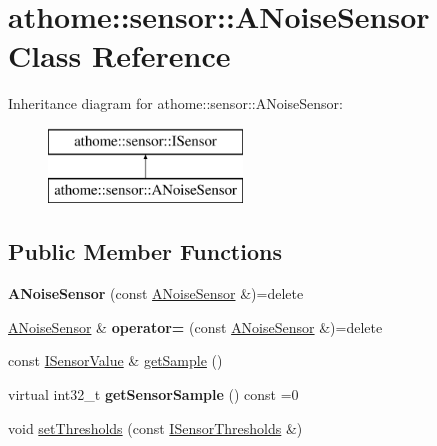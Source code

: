 \hypertarget{classathome_1_1sensor_1_1_a_noise_sensor}{}\section{athome\+:\+:sensor\+:\+:A\+Noise\+Sensor Class Reference}
\label{classathome_1_1sensor_1_1_a_noise_sensor}
Inheritance diagram for athome\+:\+:sensor\+:\+:A\+Noise\+Sensor\+:\begin{figure}[H]
\begin{center}
\leavevmode
\includegraphics[height=2.000000cm]{classathome_1_1sensor_1_1_a_noise_sensor}
\end{center}
\end{figure}
\subsection*{Public Member Functions}
\begin{DoxyCompactItemize}
\item 
\mbox{\label{classathome_1_1sensor_1_1_a_noise_sensor_add13fcd855f63aa6f0a455c341e1d6e1}} 
{\bfseries A\+Noise\+Sensor} (const \mbox{\hyperlink{classathome_1_1sensor_1_1_a_noise_sensor}{A\+Noise\+Sensor}} \&)=delete
\item 
\mbox{\label{classathome_1_1sensor_1_1_a_noise_sensor_a44ad4ecd3efe2567dfe7a32ee6aaf8b7}} 
\mbox{\hyperlink{classathome_1_1sensor_1_1_a_noise_sensor}{A\+Noise\+Sensor}} \& {\bfseries operator=} (const \mbox{\hyperlink{classathome_1_1sensor_1_1_a_noise_sensor}{A\+Noise\+Sensor}} \&)=delete
\item 
const \mbox{\hyperlink{structathome_1_1sensor_1_1_i_sensor_1_1_i_sensor_value}{I\+Sensor\+Value}} \& \mbox{\hyperlink{classathome_1_1sensor_1_1_a_noise_sensor_ab567b050b41bd0b72fcc9b94b9f6fc6e}{get\+Sample}} ()
\item 
\mbox{\label{classathome_1_1sensor_1_1_a_noise_sensor_aad5085d8b0b3ddbf49504af238040ab9}} 
virtual int32\+\_\+t {\bfseries get\+Sensor\+Sample} () const =0
\item 
void \mbox{\hyperlink{classathome_1_1sensor_1_1_a_noise_sensor_a8429e91e9f8b2e1634a405780f456beb}{set\+Thresholds}} (const \mbox{\hyperlink{structathome_1_1sensor_1_1_i_sensor_1_1_i_sensor_thresholds}{I\+Sensor\+Thresholds}} \&)
\end{DoxyCompactItemize}
